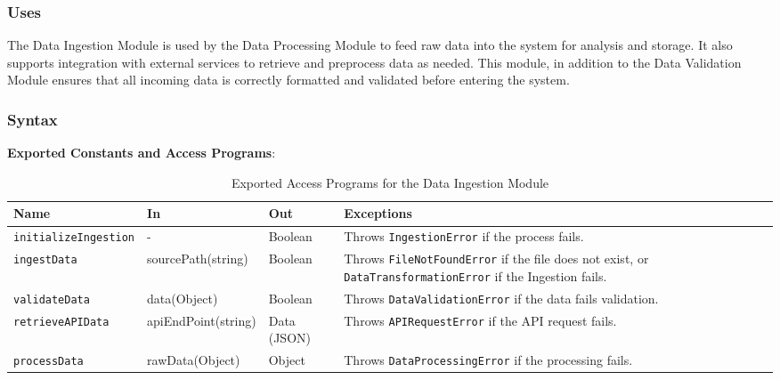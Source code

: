 \documentclass[12pt, titlepage]{article}
\begin{document}
\begin{description}
\subsubsection{Uses}
The Data Ingestion Module is used by the Data Processing Module to feed raw data into the system
for analysis and storage. It also supports integration with external services to retrieve and
preprocess data as needed. This module, in addition to the Data Validation Module ensures that all
incoming data is correctly formatted and validated before entering the system.

\subsubsection{Syntax}
\textbf{Exported Constants and Access Programs}:
  \begin{table}[H]
    \centering
    \begin{tabular}{p{} p{} p{} p{}}
    \toprule
    \textbf{Name} & \textbf{In} & \textbf{Out} & \textbf{Exceptions}\\
    \midrule
    
    \texttt{initializeIngestion} & - & Boolean & Throws \texttt{IngestionError}
    if the process fails.\\
    \midrule
    
    \texttt{ingestData} & sourcePath(string) & Boolean & Throws \texttt{FileNotFoundError}
    if the file does not exist, or \texttt{DataTransformationError} if the Ingestion fails.\\
    \midrule

    \texttt{validateData} & data(Object) & Boolean & Throws \texttt{DataValidationError}
    if the data fails validation.\\
    \midrule

    \texttt{retrieveAPIData} & apiEndPoint(string) & Data (JSON) & Throws \texttt{APIRequestError}
    if the API request fails.\\
    \midrule

    \texttt{processData} & rawData(Object) & Object & Throws \texttt{DataProcessingError}
    if the processing fails.\\
    \bottomrule
    
    \end{tabular}
    \caption{Exported Access Programs for the Data Ingestion Module}
    \label{TblEAP_Ingestion}
\end{table}


\end{description}
\end{document}

